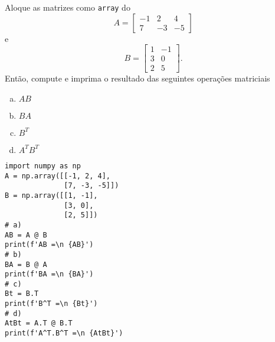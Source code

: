 \begin{exer}
  Aloque as matrizes como \lstinline+array+ do {\numpy}
  \begin{equation}
    A =
    \begin{bmatrix}
        -1 & 2 & 4\\
        7 & -3 & -5
      \end{bmatrix}      
  \end{equation}
  e
  \begin{equation}
    B =
    \begin{bmatrix}
        1 & -1\\
        3 & 0\\
        2 & 5
      \end{bmatrix}.      
  \end{equation}
  Então, compute e imprima o resultado das seguintes operações matriciais
  \begin{enumerate}[a)]
  \item $AB$
  \item $BA$
  \item $B^T$
  \item $A^TB^T$
  \end{enumerate}
\end{exer}
\begin{resp}

\begin{lstlisting}
import numpy as np
A = np.array([[-1, 2, 4],
              [7, -3, -5]])
B = np.array([[1, -1],
              [3, 0],
              [2, 5]])
# a)
AB = A @ B
print(f'AB =\n {AB}')
# b)
BA = B @ A
print(f'BA =\n {BA}')
# c)
Bt = B.T
print(f'B^T =\n {Bt}')
# d)
AtBt = A.T @ B.T
print(f'A^T.B^T =\n {AtBt}')
\end{lstlisting}

\end{resp}

